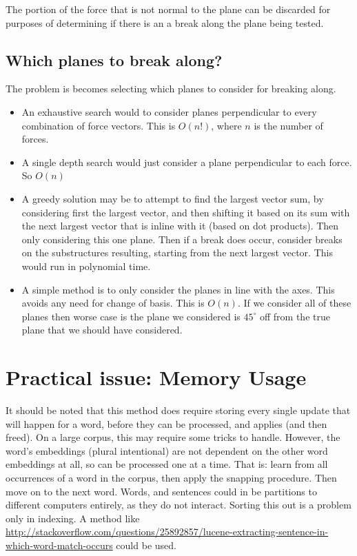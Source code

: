 \documentclass{article}
\begin{document}
The portion of the force that is not normal to the plane can be discarded for purposes of determining if there is an a break along the plane being tested.

\subsection{Which planes to break along?}
The problem is becomes selecting which planes to consider for breaking along.

\begin{itemize}
	\item An exhaustive search would to consider planes perpendicular to every combination of force vectors. This is $O(n!)$, where $n$ is the number of forces. 
	\item A single depth search would just consider a plane perpendicular to each force. So $O(n)$
	\item A greedy solution may be to attempt to find the largest vector sum, by considering first the largest vector, and then shifting it based on its sum with the next largest vector that is inline with it (based on dot products). Then only considering this one plane. Then if a break does occur, consider breaks on the substructures resulting, starting from the next largest vector. This would run in polynomial time.
	\item A simple method is to only consider the planes in line with the axes. This avoids any need for change of basis. This is $O(n)$. If we consider all of these planes then worse case is the plane we considered is $45^\circ$ off from the true plane that we should have considered.
\end{itemize}


\section{Practical issue: Memory Usage}
It should be noted that this method does require storing every single update that will happen for a word, before they can be processed, and applies (and then freed). On a large corpus, this may require some tricks to handle. 
However, the word's embeddings (plural intentional) are not dependent on the other word embeddings at all, so can be processed one at a time. That is: learn from all occurrences of a word in the corpus, then apply the snapping procedure. Then move on to the next word. Words, and sentences could in be partitions to different computers entirely, as they do not interact. Sorting this out 
is a problem only in indexing. A method like \url{http://stackoverflow.com/questions/25892857/lucene-extracting-sentence-in-which-word-match-occurs} could be used.
\end{document}
